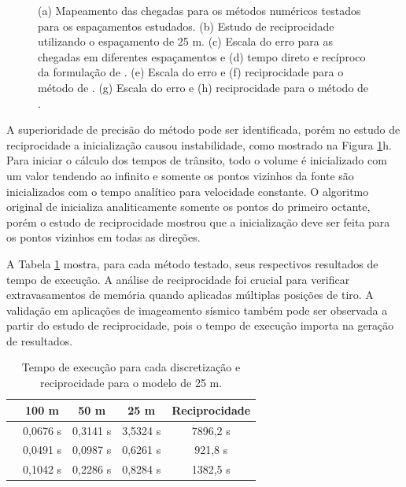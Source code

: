 \begin{figure}[H]
	\caption{(a) Mapeamento das chegadas para os métodos numéricos testados para os espaçamentos estudados. (b) Estudo de reciprocidade utilizando o espaçamento de 25 m. (c) Escala do erro para as chegadas em diferentes espaçamentos e (d) tempo direto e recíproco da formulação de . (e) Escala do erro e (f) reciprocidade para o método de . (g) Escala do erro e (h) reciprocidade para o método de .}
	\label{fig:resultsNumericalComparison}
\end{figure}

A superioridade de precisão do método  pode ser identificada, porém no estudo de reciprocidade a inicialização causou instabilidade, como mostrado na Figura \ref{fig:resultsNumericalComparison}h. Para iniciar o cálculo dos tempos de trânsito, todo o volume é inicializado com um valor tendendo ao infinito e somente os pontos vizinhos da fonte são inicializados com o tempo analítico para velocidade constante. O algoritmo original de  inicializa analiticamente somente os pontos do primeiro octante, porém o estudo de reciprocidade mostrou que a inicialização deve ser feita para os pontos vizinhos em todas as direções.  

A Tabela \ref{table_refModel} mostra, para cada método testado, seus respectivos resultados de tempo de execução. A análise de reciprocidade foi crucial para verificar extravasamentos de memória quando aplicadas múltiplas posições de tiro. A validação em aplicações de imageamento sísmico também pode ser observada a partir do estudo de reciprocidade, pois o tempo de execução importa na geração de resultados.  

\begin{table}[H]
	\caption{Tempo de execução para cada discretização e reciprocidade para o modelo de 25 m.}
	\begin{tabular}{r|cccc}
		& 100 m    & 50 m     & 25 m     & Reciprocidade \\ \hline
		\citeonline{podvin1991finite}   & 0,0676 s & 0,3141 s & 3,5324 s & 7896,2 s        \\ \hline
		\citeonline{jeong2008fast} & 0,0491 s & 0,0987 s & 0,6261 s & 921,8 s              \\ \hline
		\citeonline{noble2014accurate} & 0,1042 s & 0,2286 s & 0,8284 s & 1382,5 s          \\
	\end{tabular}
	\label{table_refModel}
\end{table}

